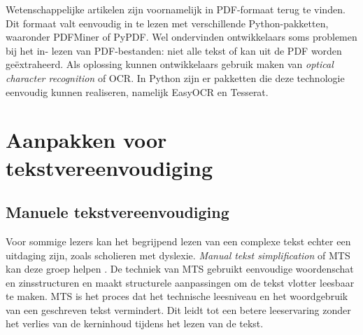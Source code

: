 \medspace

Wetenschappelijke artikelen zijn voornamelijk in PDF-formaat terug te vinden. Dit formaat valt eenvoudig in te lezen met verschillende Python-pakketten, waaronder PDFMiner of PyPDF. Wel ondervinden ontwikkelaars soms problemen bij het in- lezen van PDF-bestanden: niet alle tekst of kan uit de PDF worden geëxtraheerd. Als oplossing kunnen ontwikkelaars gebruik maken van \textit{optical character recognition} of OCR. In Python zijn er pakketten die deze technologie eenvoudig kunnen realiseren, namelijk EasyOCR en Tesserat.

\section{Aanpakken voor tekstvereenvoudiging}

\subsection{Manuele tekstvereenvoudiging}

Voor sommige lezers kan het begrijpend lezen van een complexe tekst echter een uitdaging zijn, zoals scholieren met dyslexie. \textit{Manual tekst simplification} of MTS kan deze groep helpen \autocite{Siddharthan2014}. De techniek van MTS gebruikt eenvoudige woordenschat en zinsstructuren en maakt structurele aanpassingen om de tekst vlotter leesbaar te maken. MTS is het proces dat het technische leesniveau en het woordgebruik van een geschreven tekst vermindert. Dit leidt tot een betere leeservaring zonder het verlies van de kerninhoud tijdens het lezen van de tekst.

